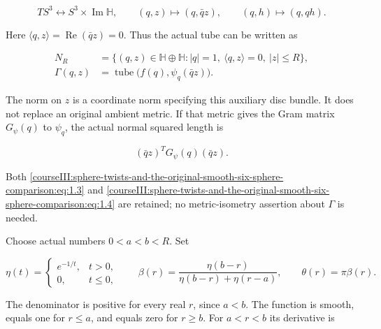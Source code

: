 \begin{equation}
TS^3\longleftrightarrow S^3\times\operatorname{Im}\mathbb H,
 \qquad(q,z)\longmapsto(q,\bar qz),\qquad
 (q,h)\longmapsto(q,qh).
 \label{courseIII:sphere-twists-and-the-original-smooth-six-sphere-comparison:eq:1.2}
\end{equation}

Here \(\langle q,z\rangle=\operatorname{Re}(\bar qz)=0\). Thus the actual tube can be written as

\begin{equation}
\begin{split}
 N_R&=\{(q,z)\in\mathbb H\oplus\mathbb H:
                   |q|=1,\ \langle q,z\rangle=0,\ |z|\le R\},\\
 \Gamma(q,z)&=\operatorname{tube}\bigl(f(q),\psi_q(\bar qz)\bigr).
 \end{split}
 \label{courseIII:sphere-twists-and-the-original-smooth-six-sphere-comparison:eq:1.3}
\end{equation}

The norm on \(z\) is a coordinate norm specifying this auxiliary disc bundle. It does not replace an original ambient metric. If that metric gives the Gram matrix \(G_\psi(q)\) to \(\psi_q\), the actual normal squared length is

\begin{equation}
(\bar qz)^T G_\psi(q)(\bar qz).
 \label{courseIII:sphere-twists-and-the-original-smooth-six-sphere-comparison:eq:1.4}
\end{equation}

Both \eqref{courseIII:sphere-twists-and-the-original-smooth-six-sphere-comparison:eq:1.3} and \eqref{courseIII:sphere-twists-and-the-original-smooth-six-sphere-comparison:eq:1.4} are retained; no metric-isometry assertion about \(\Gamma\) is needed.

Choose actual numbers \(0<a<b<R\). Set

\begin{equation}
\eta(t)=
 \begin{cases}e^{-1/t},&t>0,\\0,&t\le0,\end{cases}
 \qquad
 \beta(r)=\frac{\eta(b-r)}{\eta(b-r)+\eta(r-a)},\qquad
                       \theta(r)=\pi\beta(r).
 \label{courseIII:sphere-twists-and-the-original-smooth-six-sphere-comparison:eq:1.5}
\end{equation}

The denominator is positive for every real \(r\), since \(a<b\). The function is smooth, equals one for \(r\le a\), and equals zero for \(r\ge b\). For \(a<r<b\) its derivative is

